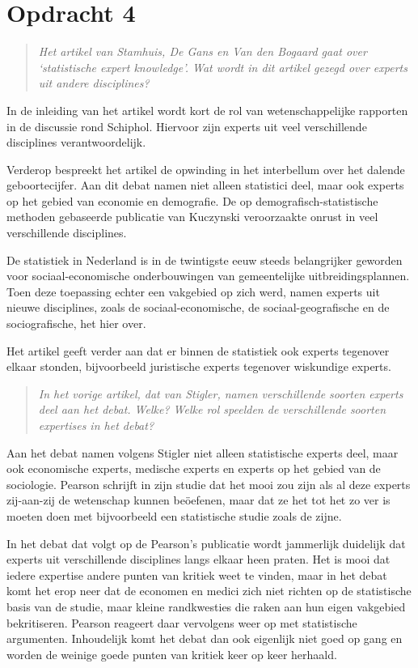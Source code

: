 \documentclass[a4paper,11pt]{article}
\begin{document}
\section*{Opdracht 4}


\begin{quote}
\emph{Het artikel van Stamhuis, De Gans en Van den Bogaard gaat over
  `statistische expert knowledge'. Wat wordt in dit artikel gezegd over
  experts uit andere disciplines?}
\end{quote}


In de inleiding van het artikel wordt kort de rol van wetenschappelijke
rapporten in de discussie rond Schiphol. Hiervoor zijn experts uit veel
verschillende disciplines verantwoordelijk.

Verderop bespreekt het artikel de opwinding in het interbellum over het
dalende geboortecijfer. Aan dit debat namen niet alleen statistici deel, maar
ook experts op het gebied van economie en demografie. De op
demografisch-statistische methoden gebaseerde publicatie van Kuczynski
veroorzaakte onrust in veel verschillende disciplines.

De statistiek in Nederland is in de twintigste eeuw steeds belangrijker
geworden voor sociaal-economische onderbouwingen van gemeentelijke
uitbreidingsplannen. Toen deze toepassing echter een vakgebied op zich werd,
namen experts uit nieuwe disciplines, zoals de sociaal-economische, de
sociaal-geografische en de sociografische, het hier over.

Het artikel geeft verder aan dat er binnen de statistiek ook experts tegenover
elkaar stonden, bijvoorbeeld juristische experts tegenover wiskundige experts.


\begin{quote}
\emph{In het vorige artikel, dat van Stigler, namen verschillende soorten
  experts deel aan het debat. Welke? Welke rol speelden de verschillende
  soorten expertises in het debat?}
\end{quote}


Aan het debat namen volgens Stigler niet alleen statistische experts deel,
maar ook economische experts, medische experts en experts op het gebied van de
sociologie. Pearson schrijft in zijn studie dat het mooi zou zijn als al deze
experts zij-aan-zij de wetenschap kunnen be\"oefenen, maar dat ze het tot het
zo ver is moeten doen met bijvoorbeeld een statistische studie zoals de
zijne.

In het debat dat volgt op de Pearson's publicatie wordt jammerlijk duidelijk
dat experts uit verschillende disciplines langs elkaar heen praten. Het is
mooi dat iedere expertise andere punten van kritiek weet te vinden, maar in
het debat komt het erop neer dat de economen en medici zich niet richten op de
statistische basis van de studie, maar kleine randkwesties die raken aan hun
eigen vakgebied bekritiseren. Pearson reageert daar vervolgens weer op met
statistische argumenten. Inhoudelijk komt het debat dan ook eigenlijk niet
goed op gang en worden de weinige goede punten van kritiek keer op keer
herhaald.
\end{document}
